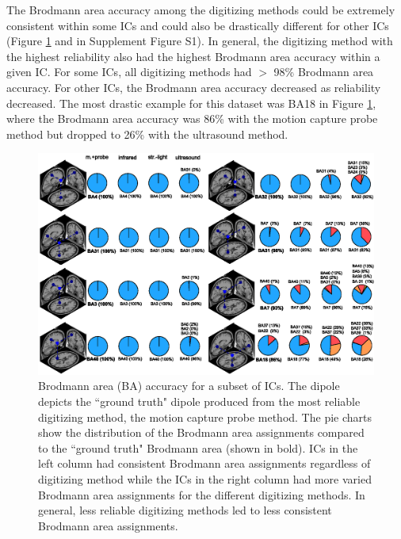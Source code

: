 \documentclass[../thesis_seyed.tex]{subfiles}
\begin{document}
The Brodmann area accuracy among the digitizing methods could be extremely consistent within some ICs and could also be drastically different for other ICs (Figure \ref{fig:r6} and in Supplement Figure S1). In general, the digitizing method with the highest reliability also had the highest Brodmann area accuracy within a given IC. For some ICs, all digitizing methods had $>$ 98\% Brodmann area accuracy. For other ICs, the Brodmann area accuracy decreased as reliability decreased. The most drastic example for this dataset was BA18 in Figure \ref{fig:r6}, where the Brodmann area accuracy was 86\% with the motion capture probe method but dropped to 26\% with the ultrasound method.

\begin{figure}[H]
    \centering
    \includegraphics[width=\linewidth]{../img/result6.eps}
    \caption{Brodmann area (BA) accuracy for a subset of ICs. The dipole depicts the ``ground truth" dipole produced from the most reliable digitizing method, the motion capture probe method. The pie charts show the distribution of the Brodmann area assignments compared to the ``ground truth" Brodmann area (shown in bold). ICs in the left column had consistent Brodmann area assignments regardless of digitizing method while the ICs in the right column had more varied Brodmann area assignments for the different digitizing methods. In general, less reliable digitizing methods led to less consistent Brodmann area assignments.}
    \label{fig:r6}
\end{figure}
\end{document}
